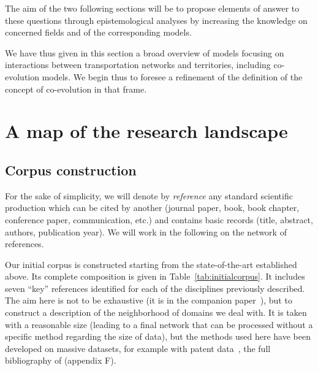 \documentclass[10pt]{article}
\begin{document}
The aim of the two following sections will be to propose elements of answer to these questions through epistemological analyses by increasing the knowledge on concerned fields and of the corresponding models.


We have thus given in this section a broad overview of models focusing on interactions between transportation networks and territories, including co-evolution models. We begin thus to foresee a refinement of the definition of the concept of co-evolution in that frame.




\section{A map of the research landscape}


\subsection{Corpus construction}

For the sake of simplicity, we will denote by \emph{reference} any standard scientific production which can be cited by another (journal paper, book, book chapter, conference paper, communication, etc.) and contains basic records (title, abstract, authors, publication year). We will work in the following on the network of references.


Our initial corpus is constructed starting from the state-of-the-art established above. Its complete composition is given in Table~\ref{tab:initialcorpus}. It includes seven ``key'' references identified for each of the disciplines previously described. The aim here is not to be exhaustive (it is in the companion paper~\cite{raimbault2020systematic}), but to construct a description of the neighborhood of domains we deal with. It is taken with a reasonable size (leading to a final network that can be processed without a specific method regarding the size of data), but the methods used here have been developed on massive datasets, for example with patent data~\cite{bergeaud2017classifying}, the full bibliography of \cite{raimbault2018caracterisation} (appendix F).
\end{document}
